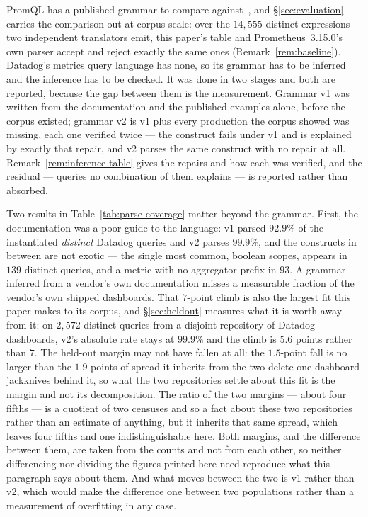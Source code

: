 PromQL has a published grammar to compare against~\citep{promql}, and
\S\ref{sec:evaluation} carries the comparison out at corpus scale: over the $14{,}555$
distinct expressions two independent translators emit, this paper's table and
Prometheus~3.15.0's own parser accept and reject exactly the same ones
(Remark~\ref{rem:baseline}). Datadog's metrics query language has none, so its grammar
has to be inferred and the inference has to be checked. It was done in two stages and both are reported, because the gap between them
is the measurement. Grammar v1 was written from the documentation and the published
examples alone, before the corpus existed; grammar v2 is v1 plus every production the
corpus showed was missing, each one verified twice --- the construct fails under v1 and
is explained by exactly that repair, and v2 parses the same construct with no repair at
all. Remark~\ref{rem:inference-table} gives the repairs and how each was verified, and
the residual --- queries no combination of them explains --- is reported rather than
absorbed.

\iffull\fi

\begin{table}[htbp]\centering\footnotesize

\caption{Parse rates over distinct queries. ``Raw'' is the share of shipped dashboard
queries that parse as written; the instantiated columns substitute dashboard template
variables first.}
\label{tab:parse-coverage}
\end{table}

Two results in Table~\ref{tab:parse-coverage} matter beyond the grammar. First, the
documentation was a poor guide to the language: v1 parsed $92.9\%$ of the instantiated
\emph{distinct} Datadog queries and v2 parses $99.9\%$, and the constructs in between
are not exotic ---
the single most common, boolean scopes, appears in $139$ distinct queries, and a metric
with no aggregator prefix in $93$. A grammar inferred from a vendor's own documentation
misses a measurable fraction of the vendor's own shipped dashboards. That $7$-point
climb is also the largest fit this paper makes to its corpus, and
\S\ref{sec:heldout} measures what it is worth away from it: on $2{,}572$ distinct queries
from a disjoint repository of Datadog dashboards, v2's absolute rate stays at $99.9\%$
and the climb is $5.6$ points rather than $7$. The held-out margin may not have fallen
at all: the $1.5$-point fall is no larger than the $1.9$ points of spread it inherits
from the two delete-one-dashboard jackknives behind it, so what the two repositories
settle about this fit is the margin and not its decomposition. The ratio of the two
margins --- about four fifths --- is a quotient of two censuses and so a fact about
these two repositories rather than an estimate of anything, but it inherits that same
spread, which leaves four fifths and one indistinguishable here. Both margins, and the
difference between them, are taken from the counts and not from each other, so neither
differencing nor dividing the figures printed here need reproduce what this paragraph
says about them. And what moves between the two is v1 rather than v2, which would make
the difference one between two populations rather than a measurement of overfitting in
any case.


